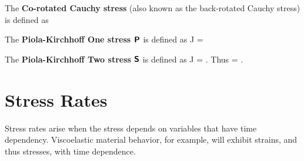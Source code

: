 The {\bf Co-rotated Cauchy stress} (also known as the back-rotated
Cauchy stress) is defined as
\be
 \hat{\ve{\sigma}}  \tRbold\transpose \ve{\sigma} \; \tRbold
\ee

The {\bf Piola-Kirchhoff One stress $\mbox{\sffamily\bfseries P}$} is defined as
\be
 \tPbold {} J \; \ve{\sigma}\; \tFbold\minustranspose 
 = \ve{\tau} \;\tFbold\minustranspose
\ee

The {\bf Piola-Kirchhoff Two stress $\mbox{\sffamily\bfseries S}$} is defined as
\be
 \tSbold
  J \; \tFbold\inverse \;\ve{\sigma} \; \tFbold\minustranspose 
 = \tFbold\inverse \; \ve{\tau}\; \tFbold\minustranspose.
\ee
Thus
\be
 \tPbold = \tFbold \tSbold.
\ee


\section{Stress Rates}
Stress rates arise when the stress depends on variables that have
time dependency.  Viscoelastic material behavior, for example, will
exhibit strains, and thus stresses, with time dependence.  

